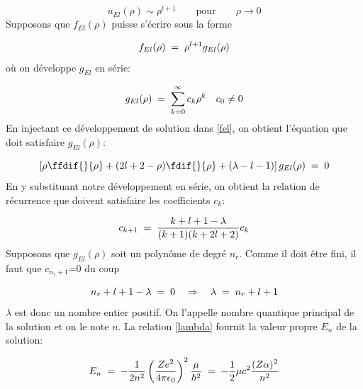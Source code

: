 \[
    u_{El}(\rho) \sim \rho^{l+1} \qquad \text{pour} \qquad \rho \longrightarrow 0
\]
Supposons que $f_{El}(\rho)$ puisse s'écrire sous la forme

\[
    f_{El}(\rho)\; = \;\rho^{l+1}g_{El}(\rho)
\]
où on développe $g_{El}$ en série:

\[
    g_{El}(\rho)\; = \;\sum_{k=0}^{\infty} c_k\rho^k \quad c_0 \neq 0
\]
En injectant ce développement de solution dans \eqref{fel}, on obtient l'équation que doit satisfaire $g_{El}(\rho)$:

\begin{equation}
    \left[\rho\ffdif{}{\rho}+(2l+2-\rho)\fdif{}{\rho}+(\lambda-l-1)\right]g_{El}(\rho)\eq0
    \label{gel}
\end{equation}
En y substituant notre développement en série, on obtient la relation de récurrence que doivent satisfaire les coefficients $c_k$:

\begin{equation}
    c_{k+1}\; = \;\dfrac{k+l+1-\lambda}{(k+1)(k+2l+2)}c_k
\end{equation}
Supposons que $g_{El}(\rho)$ soit un polynôme de degré $n_r$. Comme il doit être fini, il faut que $c_{n_{r}+1}$=0 du coup

\[
    n_r+l+1-\lambda\; = \;0 \quad \Rightarrow \quad \lambda\; = \; n_r +l+1
\]
$\lambda$ est donc un nombre entier positif. On l'appelle nombre quantique principal de la solution et on le note $n$. La relation \eqref{lambda} fournit la valeur propre $E_n$ de la solution:

\begin{equation}
    E_n\; = \; -\dfrac{1}{2n^2}\left(\dfrac{Ze^2}{4\pi\epsilon_0}\right)^2\dfrac{\mu}{\hbar^2}\; = \; -\dfrac{1}{2}\mu c^2 \dfrac{(Z\alpha)^2}{n^2}
\end{equation}


